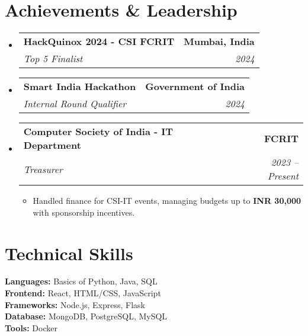 \documentclass[letterpaper,10pt]{article}
\makeatletter
\newcommand{\resumeItem}[1]{
  \item\small{
    {#1 \vspace{-3pt}}
  }
}
\newcommand{\resumeSubheading}[4]{
  \vspace{-3pt}\item
    \begin{tabular*}{1.0\textwidth}[t]{l@{\extracolsep{\fill}}r}
      \textbf{#1} & \textbf{\small #2} \\
      \textit{\small#3} & \textit{\small #4} \\
    \end{tabular*}\vspace{-8pt}
}
\newcommand{\resumeSubHeadingListStart}{\begin{itemize}[leftmargin=0.0in, label={}]}
\newcommand{\resumeSubHeadingListEnd}{\end{itemize}}
\newcommand{\resumeItemListStart}{\begin{itemize}[leftmargin=0.1in]}
\newcommand{\resumeItemListEnd}{\end{itemize}\vspace{-6pt}}
\makeatother
\begin{document}
\section{Achievements \& Leadership}
    \resumeSubHeadingListStart
      \resumeSubheading
        {HackQuinox 2024 - CSI FCRIT}{Mumbai, India}
        {Top 5 Finalist}{2024}
        
      \resumeSubheading
        {Smart India Hackathon}{Government of India}
        {Internal Round Qualifier}{2024}

      \resumeSubheading
        {Computer Society of India - IT Department}{FCRIT}
        {Treasurer}{2023 -- Present}
        \resumeItemListStart
          \resumeItem{Handled finance for CSI-IT events, managing budgets up to \textbf{INR 30,000} with sponsorship incentives.}
        \resumeItemListEnd
    \resumeSubHeadingListEnd

\section{Technical Skills}
 \begin{itemize}[leftmargin=0.1in, label={}]
    \small{\item{
     \textbf{Languages:} Basics of Python, Java, SQL \\
    \textbf{Frontend:} React, HTML/CSS, JavaScript \\
    \textbf{Frameworks:} Node.js, Express, Flask \\
    \textbf{Database:} MongoDB, PostgreSQL, MySQL \\
    \textbf{Tools:} Docker
    }}
 \end{itemize}
\end{document}
